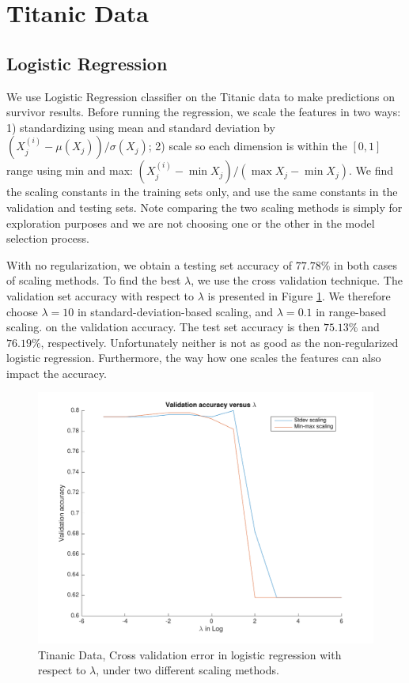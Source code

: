 
\section{Titanic Data}\label{sec:tinanic}

\subsection{Logistic Regression}
We use Logistic Regression classifier on the Titanic data to make predictions on survivor results. Before running the regression, we scale the features in two ways: 1) standardizing using mean and standard deviation by $(X_{j}^{(i)} - \mu(X_{j}))/\sigma(X_{j})$; 2) scale so each dimension is within the $[0, 1]$ range using min and max: $(X_{j}^{(i)} - \min{X_j})/(\max{X_j} - \min{X_j})$. We find the scaling constants in the training sets only, and use the same constants in the validation and testing sets. Note comparing the two scaling methods is simply for exploration purposes and we are not choosing one or the other in the model selection process.

With no regularization, we obtain a testing set accuracy of $77.78\%$ in both cases of scaling methods. To find the best $\lambda$, we use the cross validation technique. The validation set accuracy with respect to $\lambda$ is presented in Figure \ref{fig:3_LR_cv}. We therefore choose $\lambda = 10$ in standard-deviation-based scaling, and $\lambda = 0.1$ in range-based scaling. on the validation accuracy. The test set accuracy is then $75.13\%$ and $76.19\%$, respectively. Unfortunately neither is not as good as the non-regularized logistic regression. Furthermore, the way how one scales the features can also impact the accuracy.

\begin{figure}[hb]
\centering
	\includegraphics[scale=0.6]{hw2_3_cv.pdf}
	\caption{Tinanic Data, Cross validation error in logistic regression with respect to $\lambda$, under two different scaling methods.}\label{fig:3_LR_cv}
\end{figure}


